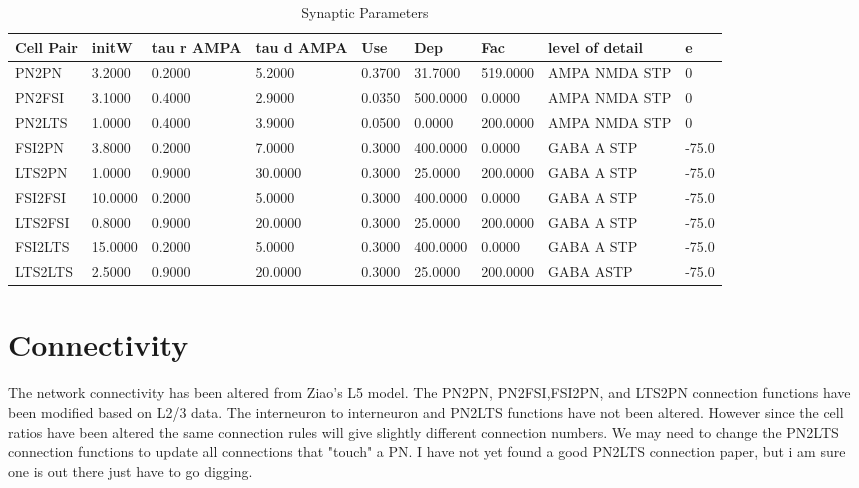 \documentclass[12pt, letterpaper]{article}
\begin{document}
\begin{table}[H]
  \centering
  \caption{Synaptic Parameters}
  \begin{tabularx}{\textwidth}{|X|X|X|X|X|X|X|X|X}
    \hline
    Cell Pair & initW & tau r AMPA & tau d AMPA & Use & Dep & Fac & level of detail & e \\ \hline
    PN2PN & 3.2000 & 0.2000 & 5.2000 & 0.3700 & 31.7000 & 519.0000 & AMPA NMDA STP & 0 \\ \hline
    PN2FSI & 3.1000 & 0.4000 & 2.9000 & 0.0350 & 500.0000 & 0.0000 & AMPA NMDA STP & 0 \\ \hline
    PN2LTS & 1.0000 & 0.4000 & 3.9000 & 0.0500 & 0.0000 & 200.0000 & AMPA NMDA STP & 0 \\ \hline
    FSI2PN & 3.8000 & 0.2000 & 7.0000 & 0.3000 & 400.0000 & 0.0000 & GABA A STP & -75.0  \\ \hline
    LTS2PN & 1.0000 & 0.9000 & 30.0000 & 0.3000 & 25.0000 & 200.0000 & GABA A STP & -75.0 \\ \hline
    FSI2FSI & 10.0000 & 0.2000 & 5.0000 & 0.3000 & 400.0000 & 0.0000 & GABA A STP & -75.0 \\ \hline
    LTS2FSI & 0.8000 & 0.9000 & 20.0000 & 0.3000 & 25.0000 & 200.0000 & GABA A STP & -75.0 \\ \hline
    FSI2LTS & 15.0000 & 0.2000 & 5.0000 & 0.3000 & 400.0000 & 0.0000 & GABA A STP & -75.0 \\ \hline
    LTS2LTS & 2.5000 & 0.9000 & 20.0000 & 0.3000 & 25.0000 & 200.0000 & GABA ASTP & -75.0 \\ \hline
  \end{tabularx}
  \label{tab:syn_prop}
\end{table}





\section*{Connectivity}
The network connectivity has been altered from Ziao's L5 model. 
The PN2PN\cite{Holmgren2003}, PN2FSI\cite{Holmgren2003},FSI2PN\cite{Holmgren2003}, and LTS2PN\cite{Fino2011} connection functions have been modified based on L2/3 data. 
The interneuron to interneuron and PN2LTS functions have not been altered.
However since the cell ratios have been altered the same connection rules will give slightly different connection numbers. 
We may need to change the PN2LTS connection functions to update all connections that "touch" a PN.
I have not yet found a good PN2LTS connection paper, but i am sure one is out there just have to go digging.
\end{document}
